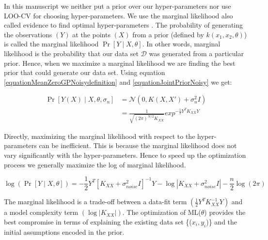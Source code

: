 In this manuscript we neither put a prior over our hyper-parameters nor use LOO-CV for choosing hyper-parameters. We use the marginal likelihood also called evidence to find optimal hyper-parameters \cite{mackay2003information}. The probability of generating the observations $(Y)$ at the points $(X)$ from a prior (defined by $k(x_{1}, x_{2}, \theta)$) is called the marginal likelihood $\Pr[Y \mid X, \theta]$. In other words, marginal likelihood is the probability that our data set $\mathcal{D}$ was generated from a particular prior. Hence, when we maximize a marginal likelihood we are finding the best prior that could generate our data set. Using equation \ref{equationMeanZeroGPNoisydefinition} and \ref{equationJointPriorNoisy} we get:

\begin{equation}\label{equationMarginalLikelihood}
\begin{aligned}
\Pr[Y(X) \mid X, \theta, \sigma_{n}] & = \mathcal{N}(0 , K(X, X') + \sigma^{2}_{n}I)  \\
& = \frac{1}{\sqrt{(2\pi)^{N/2} K_{XX}}} exp^{-\frac{1}{2}Y^{T}K_{XX}Y}
\end{aligned}
\end{equation}

 Directly, maximizing the marginal likelihood with respect to the hyper-parameters can be inefficient. This is because the marginal likelihood does not vary significantly with the hyper-parameters. Hence to speed up the optimization process we generally maximize the log of marginal likelihood. 

  \begin{equation}\label{eqExactNLML}
\log(\Pr [Y \mid X, \theta ]) = -\frac{1}{2}Y^{T}[K_{XX}+ \sigma_{noise}^{2}I]^{-1}Y - \log\left |  K_{XX}+ \sigma_{noise}^{2}I\right | - \frac{n}{2}\log(2\pi)
  \end{equation}
  
The marginal likelihood is a trade-off between a data-fit term $(\frac{1}{2}Y^{T}K_{XX}^{-1}Y)$ and a model complexity term $(\log\left |  K_{XX}\right |)$. The optimization of ML($\theta$) provides the best compromise in terms of explaining the existing data set \{($x_{i}, y_{i}$)\} and the initial assumptions encoded in the prior. 

